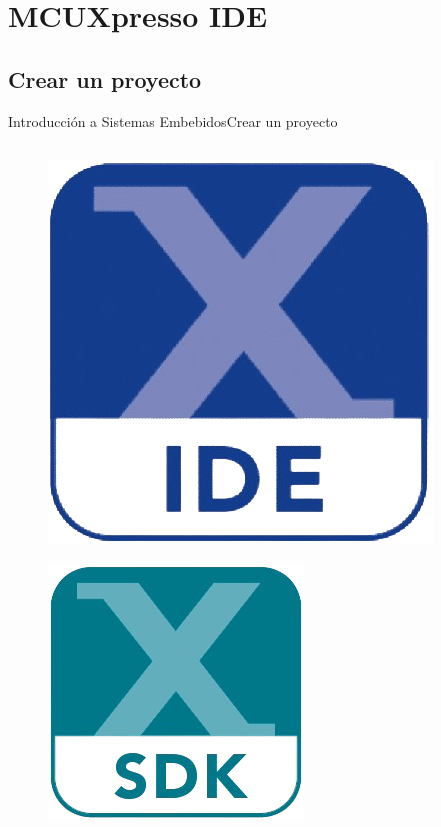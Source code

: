 \documentclass[aspectratio=169, xcolor=dvipsnames]{beamer}
\begin{document}
\section{MCUXpresso IDE}
\subsection{Crear un proyecto}
\begin{frame}{Introducción a Sistemas Embebidos}{Crear un proyecto}
\begin{columns}
\begin{column}{0.25\textwidth}
\begin{figure}
    \centering
    \href{https://www.nxp.com/design/design-center/software/development-software/mcuxpresso-software-and-tools-/mcuxpresso-integrated-development-environment-ide:MCUXpresso-IDE}{\includegraphics[width=0.5\linewidth]{resources/images/mcuxpresso_ide.png}}
\end{figure}
\begin{figure}
    \centering
    \includegraphics[width=0.5\linewidth]{resources/images/mcuxpresso_sdk.png}
\end{figure}
\end{column}
\begin{column}{0.75\textwidth}

\end{column}
\end{columns}
\end{frame}
\end{document}
